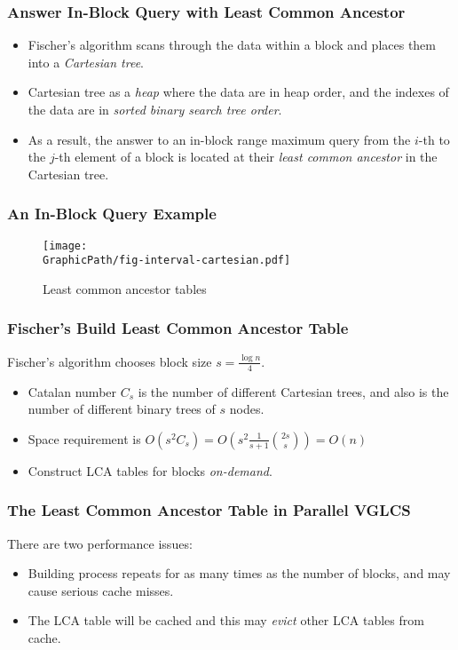 \begin{frame}
	\frametitle{Answer In-Block Query with Least Common Ancestor}
	\begin{itemize}
		\setlength\itemsep{1em}
		\item
			Fischer's algorithm scans through the data within a block
			and places them into a {\em Cartesian tree}.
		\item
			Cartesian tree as a {\em heap} where the data are in heap
			order, and the indexes of the data are in {\em sorted binary
			search tree order}.
		\item 
			As a result, the answer to an in-block range maximum query
			from the $i$-th to the $j$-th element of a block is located
			at their {\em least common ancestor} in the Cartesian tree.
	\end{itemize}
\end{frame}

\begin{frame}
	\frametitle{An In-Block Query Example}
	\begin{figure}[htbp]   
	  \centering
	  \texttt{[image: \\GraphicPath/fig-interval-cartesian.pdf]}
	  \caption{Least common ancestor tables}
	  \label{fig:ancesstor-cartesian}
	\end{figure}
\end{frame}

\begin{frame}
	\frametitle{Fischer's Build Least Common Ancestor Table}
	Fischer's algorithm chooses block size $s=\frac{\log n}{4}$.
	\begin{itemize}
		\setlength\itemsep{1em}
		\item 
			Catalan number $C_s$ is the number of different Cartesian
			trees, and also is the number of different binary trees of
			$s$ nodes.
		\item
			Space requirement is
			$O(s^2C_s)=O(s^2\frac{1}{s+1}\binom{2s}{s})=O(n)$
		\item
			Construct LCA tables for blocks {\em on-demand}.
	\end{itemize}
\end{frame}

\begin{frame}
	\frametitle{The Least Common Ancestor Table in Parallel VGLCS}
	There are two performance issues:
	\begin{itemize}
		\setlength\itemsep{1em}
		\item 
			Building process repeats for as many times as the number of
			blocks, and may cause serious cache misses.
		\item
			The LCA table will be cached and this may {\em evict} other
			LCA tables from cache.
	\end{itemize}
\end{frame}

